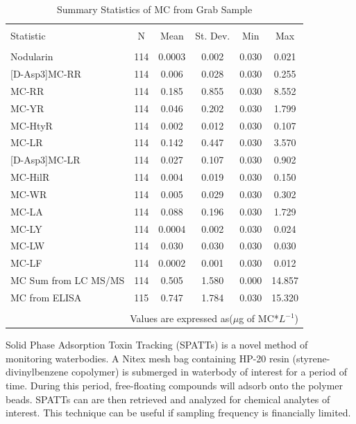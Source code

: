 \documentclass{ou-thesis}
\begin{document}
\begin{appendix}
\begin{table}[!htbp]
  \centering
  \caption{Summary Statistics of MC from Grab Sample}
  \label{statsmc}
\begin{tabular}{@{\extracolsep{5pt}}lccccc}
\\[-1.8ex]\hline
\hline \\[-1.8ex]
Statistic & \multicolumn{1}{c}{N} & \multicolumn{1}{c}{Mean} & \multicolumn{1}{c}{St. Dev.} & \multicolumn{1}{c}{Min} & \multicolumn{1}{c}{Max} \\
\hline \\[-1.8ex]
Nodularin & 114 & 0.0003 & 0.002 & 0.030 & 0.021 \\
{[D-Asp3]}MC-RR & 114 & 0.006 & 0.028 & 0.030 & 0.255 \\
MC-RR & 114 & 0.185 & 0.855 & 0.030 & 8.552 \\
MC-YR & 114 & 0.046 & 0.202 & 0.030 & 1.799 \\
MC-HtyR & 114 & 0.002 & 0.012 & 0.030 & 0.107 \\
MC-LR & 114 & 0.142 & 0.447 & 0.030 & 3.570 \\
{[D-Asp3]}MC-LR & 114 & 0.027 & 0.107 & 0.030 & 0.902 \\
MC-HilR & 114 & 0.004 & 0.019 & 0.030 & 0.150 \\
MC-WR & 114 & 0.005 & 0.029 & 0.030 & 0.302 \\
MC-LA & 114 & 0.088 & 0.196 & 0.030 & 1.729 \\
MC-LY & 114 & 0.0004 & 0.002 & 0.030 & 0.024 \\
MC-LW & 114 & 0.030 & 0.030 & 0.030 & 0.030 \\
MC-LF & 114 & 0.0002 & 0.001 & 0.030 & 0.012 \\
MC Sum from LC MS/MS  & 114 & 0.505 & 1.580 & 0.000 & 14.857 \\
MC from ELISA & 115 & 0.747 & 1.784 & 0.030 & 15.320 \\
\hline \\[-1.8ex]
\multicolumn{6}{r}{Values are expressed as($\mu$g of MC*${L^{-1}}$)} \\
\end{tabular}
\end{table}

 \newpage


Solid Phase Adsorption Toxin Tracking (SPATTs) is a novel method of monitoring waterbodies. A Nitex mesh bag containing HP-20 resin (styrene-divinylbenzene copolymer) is submerged in waterbody of interest for a period of time. During this period, free-floating compounds will adsorb onto the polymer beads. SPATTs can are then retrieved and analyzed for chemical analytes of interest. This technique can be useful if sampling frequency is financially limited.


\end{appendix}
\end{document}
